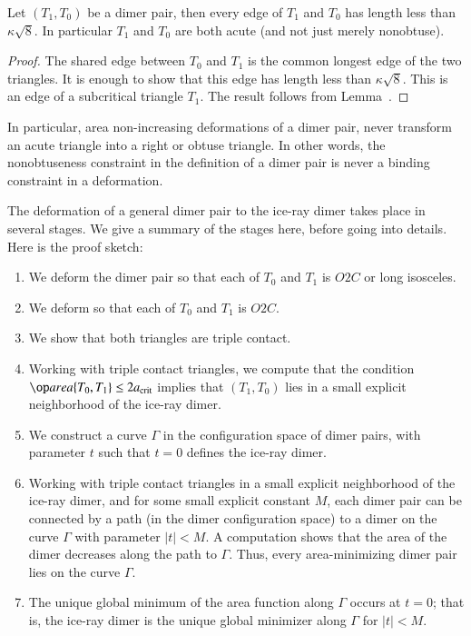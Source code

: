 \begin{lemma}  
  Let $(T_1,T_0)$ be a dimer pair, then every edge of $T_1$ and $T_0$
  has length less than $\kappa\sqrt8$.  In particular $T_1$ and $T_0$
  are both acute (and not just merely nonobtuse).
\end{lemma}

\begin{proof}  
  The shared edge between $T_0$ and $T_1$ is the common longest edge
  of the two triangles.  It is enough to show that this edge has
  length less than $\kappa\sqrt8$.  This is an edge of a subcritical
  triangle $T_1$. The result follows from Lemma~.
\end{proof}

In particular, area non-increasing deformations of a dimer pair, never
transform an acute triangle into a right or obtuse triangle.  In other
words, the nonobtuseness constraint in the definition of a dimer pair
is never a binding constraint in a deformation.

The deformation of a general dimer pair to the ice-ray dimer takes
place in several stages.  We give a summary of the stages here, before
going into details.  Here is the proof sketch:

\begin{enumerate}
\item We deform the dimer pair so that each of $T_0$ and $T_1$ is
  $O2C$ or long isosceles.
\item We deform so that each of $T_0$ and $T_1$ is $O2C$.
\item We show that both triangles are triple contact.
\item Working with triple contact triangles, we compute that the
  condition $\area\{T_0,T_1\}\le 2\acrit$ implies that $(T_1,T_0)$
  lies in a small explicit neighborhood of the ice-ray dimer.
\item We construct a curve $\Gamma$ in the configuration space of
  dimer pairs, with parameter $t$ such that $t=0$ defines the ice-ray
  dimer.
\item Working with triple contact triangles in a small explicit
  neighborhood of the ice-ray dimer, and for some small explicit
  constant $M$, each dimer pair can be connected by a path (in the
  dimer configuration space) to a dimer on the curve $\Gamma$ with
  parameter $|t|<M$.  A computation shows that the area of the dimer
  decreases along the path to $\Gamma$.  Thus, every area-minimizing
  dimer pair lies on the curve $\Gamma$.
\item The unique global minimum of the area function along $\Gamma$
  occurs at $t=0$; that is, the ice-ray dimer is the unique global
  minimizer along $\Gamma$ for $|t|<M$.
\end{enumerate}

